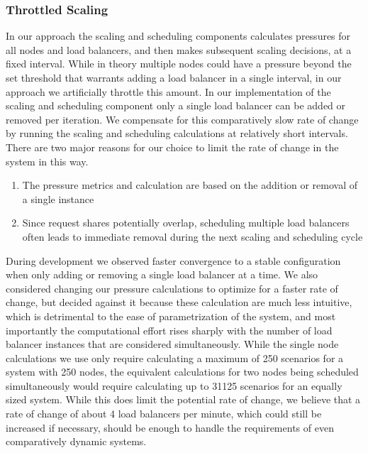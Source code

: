 \documentclass[draft,final]{vutinfth} %
\begin{document}
\subsubsection{Throttled Scaling}
In our approach the scaling and scheduling components calculates pressures for all nodes and load balancers, and then makes subsequent scaling decisions, at a fixed interval.
While in theory multiple nodes could have a pressure beyond the set threshold that warrants adding a load balancer in a single interval, in our approach we artificially throttle this amount.
In our implementation of the scaling and scheduling component only a single load balancer can be added or removed per iteration.
We compensate for this comparatively slow rate of change by running the scaling and scheduling calculations at relatively short intervals.
There are two major reasons for our choice to limit the rate of change in the system in this way.

\begin{enumerate}
    \item The pressure metrics and calculation are based on the addition or removal of a single instance
    \item Since request shares potentially overlap, scheduling multiple load balancers often leads to immediate removal during the next scaling and scheduling cycle
\end{enumerate}

During development we observed faster convergence to a stable configuration when only adding or removing a single load balancer at a time.
We also considered changing our pressure calculations to optimize for a faster rate of change, but decided against it because these calculation are much less intuitive, which is detrimental to the ease of parametrization of the system, and most importantly the computational effort rises sharply with the number of load balancer instances that are considered simultaneously.
While the single node calculations we use only require calculating a maximum of 250 scenarios for a system with 250 nodes, the equivalent calculations for two nodes being scheduled simultaneously would require calculating up to 31125 scenarios for an equally sized system.
While this does limit the potential rate of change, we believe that a rate of change of about 4 load balancers per minute, which could still be increased if necessary, should be enough to handle the requirements of even comparatively dynamic systems.




\end{document}

